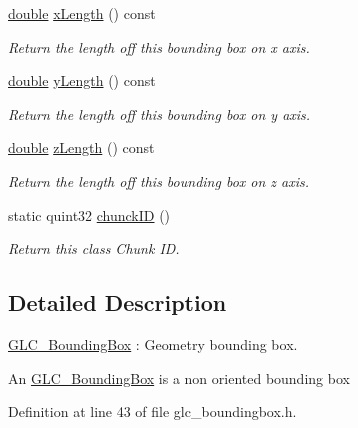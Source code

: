 \begin{DoxyCompactItemize}
\hyperlink{_super_l_u_support_8h_a8956b2b9f49bf918deed98379d159ca7}{double} \hyperlink{class_g_l_c___bounding_box_af4bcc4d093811acff5560b79230300a2}{x\-Length} () const 
\begin{DoxyCompactList}\small\item\em Return the length off this bounding box on x axis. \end{DoxyCompactList}\item 
\hyperlink{_super_l_u_support_8h_a8956b2b9f49bf918deed98379d159ca7}{double} \hyperlink{class_g_l_c___bounding_box_af46114720b7e255f7515bc5fd68ec2e4}{y\-Length} () const 
\begin{DoxyCompactList}\small\item\em Return the length off this bounding box on y axis. \end{DoxyCompactList}\item 
\hyperlink{_super_l_u_support_8h_a8956b2b9f49bf918deed98379d159ca7}{double} \hyperlink{class_g_l_c___bounding_box_a501e48b0d8289afcdb81448261e938ad}{z\-Length} () const 
\begin{DoxyCompactList}\small\item\em Return the length off this bounding box on z axis. \end{DoxyCompactList}\item 
static quint32 \hyperlink{class_g_l_c___bounding_box_abce118bc06ff0ff0cd183fee19f5a996}{chunck\-I\-D} ()
\begin{DoxyCompactList}\small\item\em Return this class Chunk I\-D. \end{DoxyCompactList}\end{DoxyCompactItemize}


\subsection{Detailed Description}
\hyperlink{class_g_l_c___bounding_box}{G\-L\-C\-\_\-\-Bounding\-Box} \-: Geometry bounding box. 

An \hyperlink{class_g_l_c___bounding_box}{G\-L\-C\-\_\-\-Bounding\-Box} is a non oriented bounding box 

Definition at line 43 of file glc\-\_\-boundingbox.\-h.



